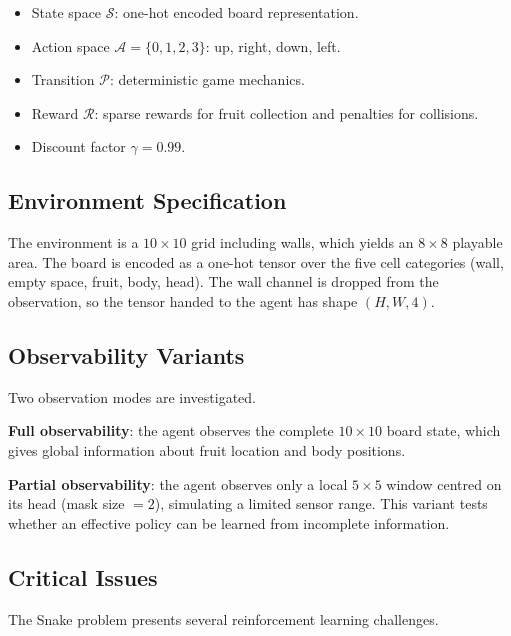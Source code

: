 \documentclass[10pt, conference, letterpaper]{IEEEtran}
\begin{document}
\begin{itemize}
  \item State space $\mathcal{S}$: one-hot encoded board representation.
  \item Action space $\mathcal{A} = \{0, 1, 2, 3\}$: up, right, down, left.
  \item Transition $\mathcal{P}$: deterministic game mechanics.
  \item Reward $\mathcal{R}$: sparse rewards for fruit collection and penalties for collisions.
  \item Discount factor $\gamma = 0.99$.
\end{itemize}

\subsection{Environment Specification}

The environment is a $10 \times 10$ grid including walls, which yields an $8 \times 8$ playable area. The board is encoded as a one-hot tensor over the five cell categories (wall, empty space, fruit, body, head). The wall channel is dropped from the observation, so the tensor handed to the agent has shape $(H, W, 4)$.

\subsection{Observability Variants}

Two observation modes are investigated.

\textbf{Full observability}: the agent observes the complete $10 \times 10$ board state, which gives global information about fruit location and body positions.

\textbf{Partial observability}: the agent observes only a local $5 \times 5$ window centred on its head (mask size $= 2$), simulating a limited sensor range. This variant tests whether an effective policy can be learned from incomplete information.

\subsection{Critical Issues}

The Snake problem presents several reinforcement learning challenges.
\end{document}
